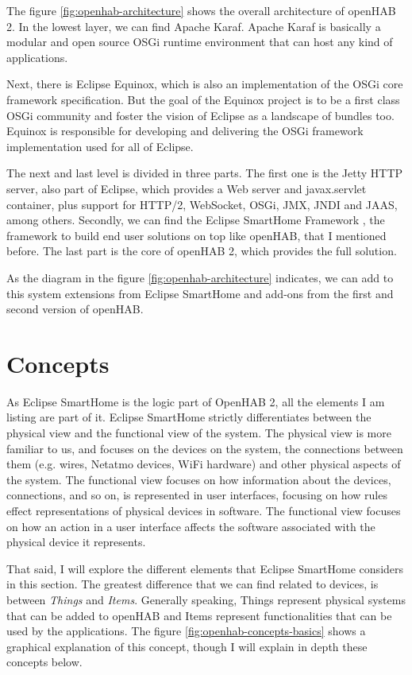 The figure \ref{fig:openhab-architecture} shows the overall architecture of openHAB 2. In the lowest layer, we can find Apache Karaf.
Apache Karaf is basically a modular and open source OSGi runtime environment that can host any kind of applications.\cite{apacheKaraf}
 
Next, there is Eclipse Equinox, which is also an implementation of the OSGi core framework specification. But the goal of the Equinox
project is to be a first class OSGi community and foster the vision of Eclipse as a landscape of bundles too. Equinox is responsible for
developing and delivering the OSGi framework implementation used for all of Eclipse.\cite{eclipseEquinox} 

The next and last level is divided in three parts. The first one is the Jetty HTTP server, also part of Eclipse, which provides a Web server 
and javax.servlet container, plus support for HTTP/2, WebSocket, OSGi, JMX, JNDI and JAAS, among others.\cite{eclipseJetty} Secondly,
we can find the Eclipse SmartHome Framework , the framework to build end user solutions on top like openHAB, that I mentioned 
before.\cite{eclipseSmartHomeDocs} The last part is the core of openHAB 2, which provides the full solution.

As the diagram in the figure \ref{fig:openhab-architecture} indicates, we can add to this system extensions from Eclipse SmartHome and
add-ons from the first and second version of openHAB.

\bigskip
\section{Concepts}
As Eclipse SmartHome is the logic part of OpenHAB 2, all the elements I am listing are part of it. Eclipse SmartHome strictly differentiates
between the physical view and the functional view of the system. The physical view is more familiar to us, and focuses on the devices
on the system, the connections between them (e.g. wires, Netatmo devices, WiFi hardware) and other physical aspects of the system.
The functional view focuses on how information about the devices, connections, and so on, is represented in user interfaces, focusing
on how rules effect representations of physical devices in software. The functional view focuses on how an action in a user interface
affects the software associated with the physical device it represents.\cite{openHABDocs}

That said, I will explore the different elements that Eclipse SmartHome considers in this section. The greatest difference that we can find
related to devices, is between \textit{Things} and \textit{Items}. Generally speaking, Things represent physical systems that can be added
to openHAB and Items represent functionalities that can be used by the applications. The figure \ref{fig:openhab-concepts-basics} 
shows a graphical explanation of this concept, though I will explain in depth these concepts below.

